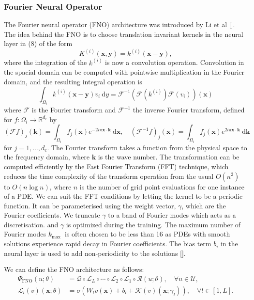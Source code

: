 \documentclass{article}
\begin{document}
\subsubsection{Fourier Neural Operator}

The Fourier neural operator (FNO) architecture was introduced by Li et al []. The idea behind the FNO is to choose translation invariant kernels in the neural layer in (8) of the form
$$
K^{(i)}(\boldsymbol{x}, \boldsymbol{y})=k^{(i)}(\boldsymbol{x}-\boldsymbol{y}),
$$
where the integration of the $k^{(i)}$ is now a convolution operation. Convolution in the spacial domain can be computed with pointwise multiplication in the Fourier domain, and the resulting integral operation is 
$$
\int_{\Omega_{i}} k^{(i)}(\boldsymbol{x}-\boldsymbol{y}) v_{i} \mathrm{~d} y=\mathcal{F}^{-1}\left(\mathcal{F}\left(k^{(i)}\right) \mathcal{F}\left(v_{i}\right)\right)(\boldsymbol{x})
$$
where $\mathcal{F}$ is the Fourier transform and $\mathcal{F}^{-1}$ the inverse Fourier transform, defined for $f: \Omega_{i} \rightarrow \mathbb{R}^{d_{c}}$ by
$$
(\mathcal{F} f)_{j}(\boldsymbol{k})=\int_{\Omega_{i}} f_{j}(\boldsymbol{x}) e^{-2 i \pi \boldsymbol{x} \cdot \boldsymbol{k}} \mathrm{~d} \boldsymbol{x}, \quad\left(\mathcal{F}^{-1} f\right)_{j}(\boldsymbol{x})=\int_{\Omega_{i}} f_{j}(\boldsymbol{x}) e^{2 i \pi \boldsymbol{x} \cdot \boldsymbol{k}} \mathrm{~d} \boldsymbol{k}
$$
for $j=1, \ldots, d_{c}$. 
The Fourier transform takes a function from the physical space to the frequency domain, where $\boldsymbol{k}$ is the wave number. The transformation can be computed efficiently by the Fast Fourier Transform (FFT) technique, which reduces the time complexity of the transform operation from the usual $O(n^2)$ to $O(n \log n)$, where $n$ is the number of grid point evaluations for one instance of a PDE. We can suit the FFT conditions by letting the kernel to be a periodic function. It can be parameterised using the weight vector, $\gamma$, which are the Fourier coefficients. We truncate $\gamma$ to a band of Fourier modes which acts as a discretisation. and $\gamma$ is optimized during the training. The maximum number of Fourier modes $k_{\text {max }}$ is often chosen to be less than 16 as PDEs with smooth solutions experience rapid decay in Fourier coefficients. The bias term $b_{i}$ in the neural layer is used to add non-periodicity to the solutions [].

We can define the FNO architecture as follows:
$$
\begin{aligned}
\Psi_{\mathrm{FNO}}(u ; \theta) & =\mathcal{Q} \circ \mathcal{L}_{L} \circ \cdots \circ \mathcal{L}_{2} \circ \mathcal{L}_{1} \circ \mathcal{R}(u ; \theta), \quad \forall u \in \mathcal{U}, \\
\mathcal{L}_{l}(v)(\boldsymbol{x} ; \theta) & =\sigma\left(W_{l} v(\boldsymbol{x})+b_{l}+\mathcal{K}(v)\left(\boldsymbol{x} ; \gamma_{l}\right)\right), \quad \forall l \in[1, L] .
\end{aligned}
$$
\end{document}
